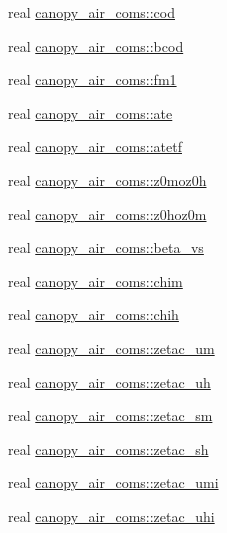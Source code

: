 \begin{DoxyCompactItemize}
\item 
real \hyperlink{namespacecanopy__air__coms_adc430e44db14a933a4e8359ca834f454}{canopy\+\_\+air\+\_\+coms\+::cod}
\item 
real \hyperlink{namespacecanopy__air__coms_a6a1bee0c06adf9bb369d6f4be822b553}{canopy\+\_\+air\+\_\+coms\+::bcod}
\item 
real \hyperlink{namespacecanopy__air__coms_a41f3ccd2dbb2ccf460109a71a4f66d89}{canopy\+\_\+air\+\_\+coms\+::fm1}
\item 
real \hyperlink{namespacecanopy__air__coms_ae25648cf7af6ad979525a213bc95b1b3}{canopy\+\_\+air\+\_\+coms\+::ate}
\item 
real \hyperlink{namespacecanopy__air__coms_a5fa870deca6638beca69104f25090cc6}{canopy\+\_\+air\+\_\+coms\+::atetf}
\item 
real \hyperlink{namespacecanopy__air__coms_a830ea7ede87dfca30dde16179c04172e}{canopy\+\_\+air\+\_\+coms\+::z0moz0h}
\item 
real \hyperlink{namespacecanopy__air__coms_a8c832d21677dc5ff228d7717066c04b0}{canopy\+\_\+air\+\_\+coms\+::z0hoz0m}
\item 
real \hyperlink{namespacecanopy__air__coms_ad363ff87eeee7cb190ebe28e9b682f9a}{canopy\+\_\+air\+\_\+coms\+::beta\+\_\+vs}
\item 
real \hyperlink{namespacecanopy__air__coms_ac8d65859576c96d4d161e975d040b083}{canopy\+\_\+air\+\_\+coms\+::chim}
\item 
real \hyperlink{namespacecanopy__air__coms_a3afe3afdcc5b2015a51b7072b67354d6}{canopy\+\_\+air\+\_\+coms\+::chih}
\item 
real \hyperlink{namespacecanopy__air__coms_a336486cace202aa0ccad3309337c68f5}{canopy\+\_\+air\+\_\+coms\+::zetac\+\_\+um}
\item 
real \hyperlink{namespacecanopy__air__coms_a22bb3e31261ca100bb41c7413b22c9bf}{canopy\+\_\+air\+\_\+coms\+::zetac\+\_\+uh}
\item 
real \hyperlink{namespacecanopy__air__coms_a72a86a5fffac73ad56991aa0ca9827d4}{canopy\+\_\+air\+\_\+coms\+::zetac\+\_\+sm}
\item 
real \hyperlink{namespacecanopy__air__coms_a11e1cdd8db228dc78ea7ddef9d6414d1}{canopy\+\_\+air\+\_\+coms\+::zetac\+\_\+sh}
\item 
real \hyperlink{namespacecanopy__air__coms_abf9c0a3d2a8c55db802325a22226d5ad}{canopy\+\_\+air\+\_\+coms\+::zetac\+\_\+umi}
\item 
real \hyperlink{namespacecanopy__air__coms_a99110673906c4d2b492c4655450479ba}{canopy\+\_\+air\+\_\+coms\+::zetac\+\_\+uhi}

\end{DoxyCompactItemize}

